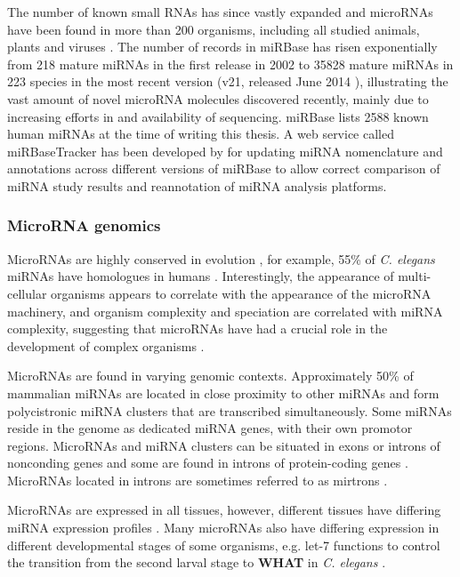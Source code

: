 The number of known small RNAs has since vastly expanded
and microRNAs have been found in more than 200 organisms, including
all studied animals, plants \citep{JonesRhoades2006} and viruses \citep{Grundhoff2011}. 
The number of records in miRBase has risen exponentially
from %
218 mature miRNAs in the first release in 2002 to %
35828 mature miRNAs in 223 species in the most recent version (v21, released June
2014 \citep{VanPeer2014,MiRBaseWeb}), illustrating the vast amount of novel
microRNA molecules discovered recently, mainly due to increasing efforts in
and availability of sequencing. miRBase lists 2588 known human miRNAs at the
time of writing this thesis. A web service called miRBaseTracker has been
developed by \citet{VanPeer2014} for updating miRNA nomenclature and
annotations across different versions of miRBase to allow correct comparison
of miRNA study results and reannotation of miRNA analysis platforms.



\subsubsection{MicroRNA genomics}\label{microrna-genomics}

MicroRNAs are highly conserved in evolution \citep{Bartel2004}, for example,
55\% of \emph{C. elegans} miRNAs have homologues in humans
\citep{IbanezVentoso2008}. Interestingly, the
appearance of multi-cellular organisms appears to correlate with the
appearance of the microRNA machinery, and organism complexity and speciation
are correlated with miRNA complexity, suggesting that microRNAs have had a
crucial role in the development of complex organisms \citep{Lee2007}.

MicroRNAs are found in varying genomic contexts. Approximately 50\% of
mammalian miRNAs are located in close proximity to other miRNAs and form
polycistronic miRNA clusters that are transcribed simultaneously. Some miRNAs
reside in the genome as dedicated miRNA genes, with their own promotor regions.
\citep{Kim2009} MicroRNAs and miRNA clusters can be situated in exons or
introns of nonconding genes and some are found in introns of protein-coding genes
\citep{Du2005}. MicroRNAs located in introns are sometimes referred to as
mirtrons \citep{Ruby2007}.

MicroRNAs are expressed in all tissues, however, different tissues
have differing miRNA expression profiles \citep{Krol2010}. Many microRNAs also
have differing expression in different developmental stages
of some organisms, e.g. let-7 functions to control the transition
from the second larval stage to \textbf{WHAT} in \emph{C. elegans} \citep{Bartel2004}.


